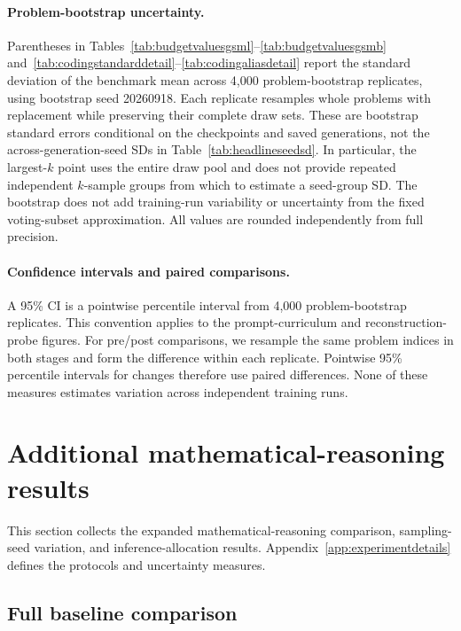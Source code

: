 \documentclass{article}
\begin{document}
\paragraph{Problem-bootstrap uncertainty.}
Parentheses in Tables~\ref{tab:budgetvaluesgsml}--\ref{tab:budgetvaluesgsmb} and~\ref{tab:codingstandarddetail}--\ref{tab:codingaliasdetail} report the standard deviation of the benchmark mean across 4,000 problem-bootstrap replicates, using bootstrap seed 20260918. Each replicate resamples whole problems with replacement while preserving their complete draw sets. These are bootstrap standard errors conditional on the checkpoints and saved generations, not the across-generation-seed SDs in Table~\ref{tab:headlineseedsd}. In particular, the largest-$k$ point uses the entire draw pool and does not provide repeated independent $k$-sample groups from which to estimate a seed-group SD. The bootstrap does not add training-run variability or uncertainty from the fixed voting-subset approximation. All values are rounded independently from full precision.

\paragraph{Confidence intervals and paired comparisons.}
A 95\% CI is a pointwise percentile interval from 4,000 problem-bootstrap replicates. This convention applies to the prompt-curriculum and reconstruction-probe figures. For pre/post comparisons, we resample the same problem indices in both stages and form the difference within each replicate. Pointwise 95\% percentile intervals for changes therefore use paired differences. None of these measures estimates variation across independent training runs.


\clearpage
\section{Additional mathematical-reasoning results}
\label{app:mathresults}

This section collects the expanded mathematical-reasoning comparison, sampling-seed variation, and inference-allocation results. Appendix~\ref{app:experimentdetails} defines the protocols and uncertainty measures.

\subsection{Full baseline comparison}
\label{app:fullcomparison}
\end{document}
